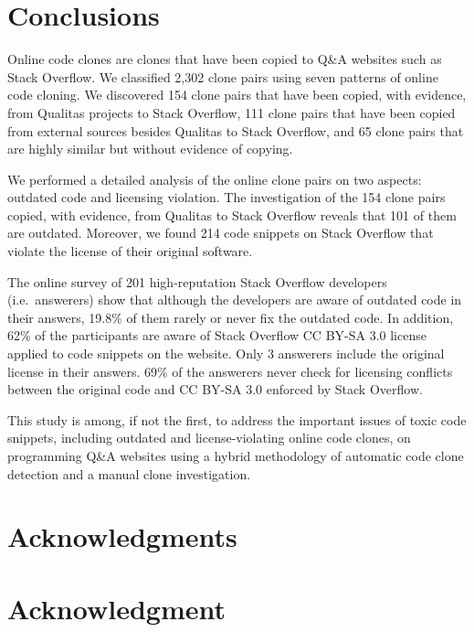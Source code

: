 \documentclass[10pt,journal,compsoc]{IEEEtran}
\begin{document}
\section{Conclusions}

Online code clones are clones that have been copied to Q\&A websites
such as Stack Overflow. 
We classified 2,302 clone pairs using seven patterns of online code
cloning. We discovered 154 clone pairs that have been
copied, with evidence, from Qualitas projects to Stack Overflow, 111
clone pairs that have been copied from external sources besides
Qualitas to Stack Overflow, and 65 clone pairs that are highly
similar but without evidence of copying.

We performed a detailed analysis of the online clone pairs on two
aspects: outdated code and licensing violation. The investigation of
the 154 clone pairs copied, with evidence, from Qualitas to Stack
Overflow reveals that 101 of them are outdated.  Moreover, we found 214
code snippets on Stack Overflow that violate the license of their
original software.

The online survey of 201 high-reputation Stack Overflow developers (i.e.~answerers)
show that although the developers are aware of outdated code in their answers,
19.8\% of them rarely or never fix the outdated code. In addition, 62\% of the participants
are aware of Stack Overflow CC BY-SA 3.0 license applied to code snippets on the website.
Only 3 answerers include the original license in their answers. 69\% of the answerers
never check for licensing conflicts between the original code and CC BY-SA 3.0 
enforced by Stack Overflow.

This study is among, if not the first, to address the important issues of toxic
code snippets, including outdated and license-violating online code clones, on
programming Q\&A websites using a hybrid methodology of automatic code clone
detection and a manual clone investigation.


\ifCLASSOPTIONcompsoc
  \section*{Acknowledgments}
\else
  \section*{Acknowledgment}
\fi
\end{document}

